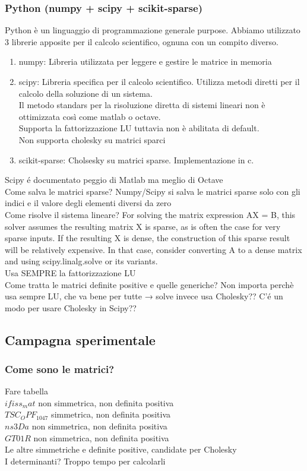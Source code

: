 \documentclass{beamer}
\begin{document}
\begin{frame}
\frametitle{Python (numpy + scipy + scikit-sparse)}
Python è un linguaggio di programmazione generale purpose. Abbiamo utilizzato 3 librerie apposite per il calcolo scientifico, ognuna con un compito diverso.
\begin{enumerate}
	\item numpy: Libreria utilizzata per leggere e gestire le matrice in memoria
	\item scipy: Libreria specifica per il calcolo scientifico. Utilizza metodi diretti per il calcolo della soluzione di un sistema.\\
	Il metodo standars per la risoluzione diretta di sistemi lineari non è ottimizzata così come matlab o octave.\\
	Supporta la fattorizzazione LU tuttavia non è abilitata di default.\\
	Non supporta cholesky su matrici sparci
	\item scikit-sparse: Cholsesky su matrici sparse. Implementazione in c.
\end{enumerate}
Scipy \'e documentato peggio di Matlab ma meglio di Octave \\
Come salva le matrici sparse? Numpy/Scipy si salva le matrici sparse solo con gli indici e il valore degli elementi diversi da zero\\
Come risolve il sistema lineare?
For solving the matrix expression AX = B, this solver assumes the resulting matrix X is sparse, as is often the case for very sparse inputs. If the resulting X is dense, the construction of this sparse result will be relatively expensive. In that case, consider converting A to a dense matrix and using scipy.linalg.solve or its variants.\\
Usa SEMPRE la fattorizzazione LU\\
Come tratta le matrici definite positive e quelle generiche? Non importa perchè usa sempre LU, che va bene per tutte → solve invece usa Cholesky?? C’\'e un modo per usare Cholesky in Scipy??
\end{frame}

\subsection{Campagna sperimentale}

\frametitle{Come sono le matrici?}
\begin{frame}
Fare tabella\\
$ifiss_mat$ non simmetrica, non definita positiva\\
$TSC_OPF_1047$ simmetrica, non definita positiva\\
$ns3Da$ non simmetrica, non definita positiva\\
$GT01R$ non simmetrica, non definita positiva\\
Le altre simmetriche e definite positive, candidate per Cholesky\\
I determinanti? Troppo tempo per calcolarli
\end{frame}
\end{document}
